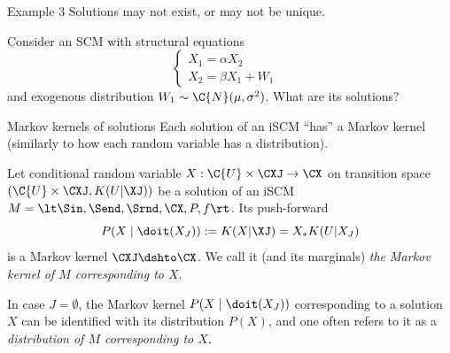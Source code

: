 \begin{frame}[t]{Example 3}
Solutions may not exist, or may not be unique.
\begin{Eg}
Consider an SCM with structural equations
$$\begin{cases}
  X_1 = \alpha X_2 & \\
  X_2 = \beta X_1 + W_1 &
\end{cases}$$
and exogenous distribution $W_1 \sim \C{N}(\mu,\sigma^2)$. What are its solutions?

\bigskip
{}
\end{Eg}
\end{frame}

\begin{frame}{Markov kernels of solutions}
Each solution of an iSCM ``has'' a Markov kernel (similarly to how each random variable has a distribution).
\begin{Not}[\ref{def:scm_kernels}]
  Let conditional random variable $X : \C{U} \times \CXJ \to \CX$ on transition space $(\C{U} \times \CXJ, K(U|\XJ))$ be a solution of an iSCM
  $M = \lt \Sin, \Send, \Srnd, \CX, P, f \rt$.
  Its push-forward 
  $$P(X \mid \doit(X_J)) := K(X|\XJ) = X_* K(U|X_J)$$
  is a Markov kernel $\CXJ \dshto \CX$.
  We call it (and its marginals) \emph{the Markov kernel of $M$ corresponding to $X$}.
\end{Not}

\begin{Rem}
In case $J = \emptyset$, the Markov kernel $P(X \mid \doit(X_J))$ corresponding to a solution $X$ can be identified with its distribution $P(X)$, and one often refers to it as a \emph{distribution of $M$ corresponding to $X$}.
\end{Rem}
\end{frame}

